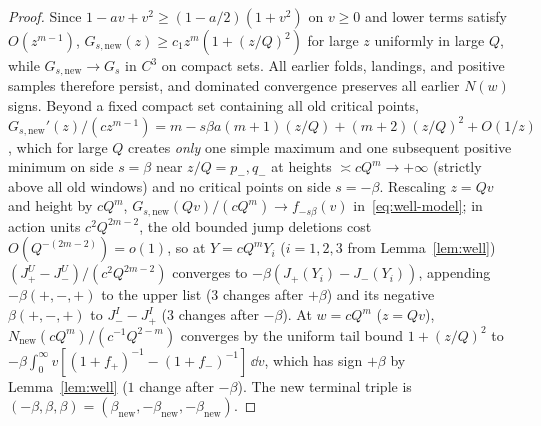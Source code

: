 \begin{proof}
Since $1-av+v^2\ge(1-a/2)(1+v^2)$ on $v\ge 0$ and lower terms satisfy $O(z^{m-1})$, $G_{s,\mathrm{new}}(z)\ge c_1 z^m(1+(z/Q)^2)$ for large $z$ uniformly in large $Q$, while $G_{s,\mathrm{new}}\to G_s$ in $C^3$ on compact sets. All earlier folds, landings, and positive samples therefore persist, and dominated convergence preserves all earlier $N(w)$ signs. Beyond a fixed compact set containing all old critical points, $G_{s,\mathrm{new}}'(z)/(cz^{m-1})=m-s\beta a(m+1)(z/Q)+(m+2)(z/Q)^2+O(1/z)$, which for large $Q$ creates \emph{only} one simple maximum and one subsequent positive minimum on side $s=\beta$ near $z/Q=p_-,q_-$ at heights $\asymp cQ^m\to+\infty$ (strictly above all old windows) and no critical points on side $s=-\beta$. Rescaling $z=Qv$ and height by $cQ^m$, $G_{s,\mathrm{new}}(Qv)/(cQ^m)\to f_{-s\beta}(v)$ in~\eqref{eq:well-model}; in action units $c^2 Q^{2m-2}$, the old bounded jump deletions cost $O(Q^{-(2m-2)})=o(1)$, so at $Y=cQ^m Y_i$ ($i=1,2,3$ from Lemma~\ref{lem:well}) $(J_+^U-J_-^U)/(c^2 Q^{2m-2})$ converges to $-\beta(J_+(Y_i)-J_-(Y_i))$, appending $-\beta(+,-,+)$ to the upper list ($3$ changes after $+\beta$) and its negative $\beta(+,-,+)$ to $J_-^I-J_+^I$ ($3$ changes after $-\beta$). At $w=cQ^m$ ($z=Qv$), $N_{\mathrm{new}}(cQ^m)/(c^{-1}Q^{2-m})$ converges by the uniform tail bound $1+(z/Q)^2$ to $-\beta\int_0^\infty v[(1+f_+)^{-1}-(1+f_-)^{-1}]\,\dd v$, which has sign $+\beta$ by Lemma~\ref{lem:well} ($1$ change after $-\beta$). The new terminal triple is $(-\beta,\beta,\beta)=(\beta_{\mathrm{new}},-\beta_{\mathrm{new}},-\beta_{\mathrm{new}})$.
\end{proof}
